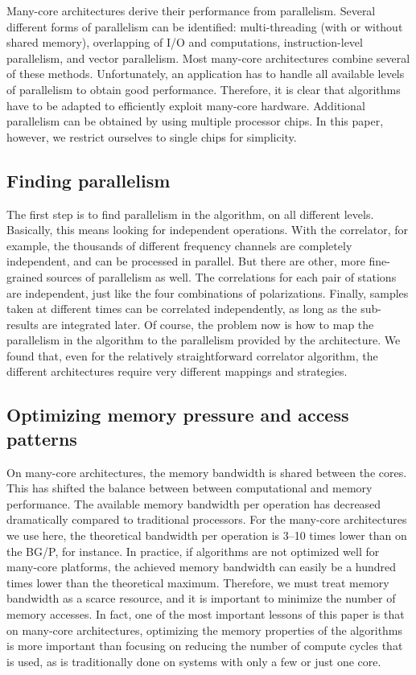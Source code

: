 \documentclass{article}
\begin{document}
Many-core architectures derive their performance from parallelism.
Several different forms of parallelism can be identified:
multi-threading (with or without shared memory), overlapping of I/O
and computations, instruction-level parallelism, and vector parallelism. Most
many-core architectures combine several of these methods.  
Unfortunately, an application has to handle all available levels of parallelism to
obtain good performance.
Therefore, it is clear that algorithms have to be adapted to efficiently exploit
many-core hardware.
Additional parallelism can be obtained by using multiple processor chips.
In this paper, however, we restrict ourselves to single chips for simplicity.



\subsection{Finding parallelism}

The first step is to find parallelism in the algorithm, on all
different levels.  Basically, this means looking for independent
operations.  With the correlator, for example, the thousands of
different frequency channels are completely independent, and can be
processed in parallel. But there are other, more fine-grained sources
of parallelism as well.  The correlations for each pair of stations
are independent, just like the four combinations of  
polarizations.  Finally, samples taken at different times can
be correlated independently, as long as the sub-results are integrated
later. Of course, the problem now is how to map the parallelism in the
algorithm to the parallelism provided by the architecture. We found
that, even for the relatively straightforward correlator algorithm,
the different architectures require very different mappings and
strategies.


\subsection{Optimizing memory pressure and access patterns}

On many-core architectures, the memory bandwidth is shared between the
cores.  This has shifted the balance between between computational and
memory performance.  The available memory bandwidth per operation has
decreased dramatically compared to traditional processors.  For the
many-core architectures we use here, the theoretical bandwidth per operation is
3--10 times lower than on the BG/P, for instance. In practice, if algorithms
are not optimized well for many-core platforms, the achieved memory bandwidth can
easily be a hundred times lower than the theoretical maximum.
Therefore, we must
treat memory bandwidth as a scarce resource, and it is important to
minimize the number of memory accesses.  In fact, one of the most
important lessons of this paper is that on many-core architectures,
optimizing the memory properties of the algorithms is more important
than focusing on reducing the number of compute cycles that is used,
as is traditionally done on systems with only a few or just one core.
\end{document}
